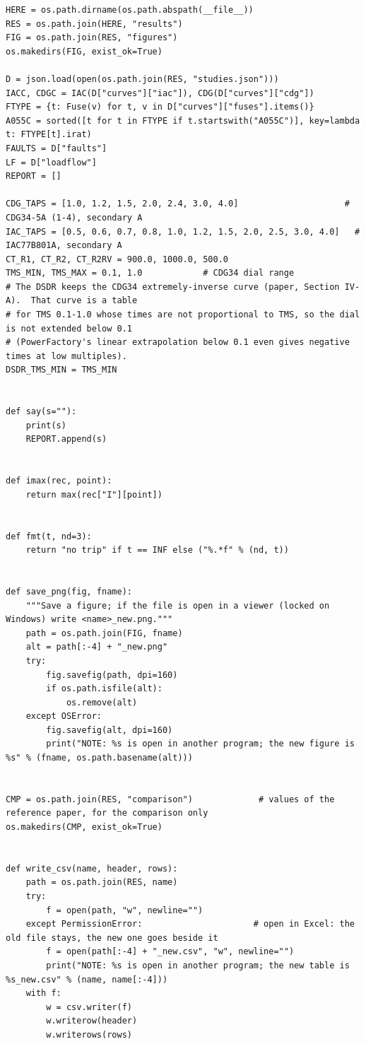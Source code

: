 \documentclass[12pt,a4paper]{article}
\begin{document}
\begin{lstlisting}
HERE = os.path.dirname(os.path.abspath(__file__))
RES = os.path.join(HERE, "results")
FIG = os.path.join(RES, "figures")
os.makedirs(FIG, exist_ok=True)

D = json.load(open(os.path.join(RES, "studies.json")))
IACC, CDGC = IAC(D["curves"]["iac"]), CDG(D["curves"]["cdg"])
FTYPE = {t: Fuse(v) for t, v in D["curves"]["fuses"].items()}
A055C = sorted([t for t in FTYPE if t.startswith("A055C")], key=lambda t: FTYPE[t].irat)
FAULTS = D["faults"]
LF = D["loadflow"]
REPORT = []

CDG_TAPS = [1.0, 1.2, 1.5, 2.0, 2.4, 3.0, 4.0]                     # CDG34-5A (1-4), secondary A
IAC_TAPS = [0.5, 0.6, 0.7, 0.8, 1.0, 1.2, 1.5, 2.0, 2.5, 3.0, 4.0]   # IAC77B801A, secondary A
CT_R1, CT_R2, CT_R2RV = 900.0, 1000.0, 500.0
TMS_MIN, TMS_MAX = 0.1, 1.0            # CDG34 dial range
# The DSDR keeps the CDG34 extremely-inverse curve (paper, Section IV-A).  That curve is a table
# for TMS 0.1-1.0 whose times are not proportional to TMS, so the dial is not extended below 0.1
# (PowerFactory's linear extrapolation below 0.1 even gives negative times at low multiples).
DSDR_TMS_MIN = TMS_MIN


def say(s=""):
    print(s)
    REPORT.append(s)


def imax(rec, point):
    return max(rec["I"][point])


def fmt(t, nd=3):
    return "no trip" if t == INF else ("%.*f" % (nd, t))


def save_png(fig, fname):
    """Save a figure; if the file is open in a viewer (locked on Windows) write <name>_new.png."""
    path = os.path.join(FIG, fname)
    alt = path[:-4] + "_new.png"
    try:
        fig.savefig(path, dpi=160)
        if os.path.isfile(alt):
            os.remove(alt)
    except OSError:
        fig.savefig(alt, dpi=160)
        print("NOTE: %s is open in another program; the new figure is %s" % (fname, os.path.basename(alt)))


CMP = os.path.join(RES, "comparison")             # values of the reference paper, for the comparison only
os.makedirs(CMP, exist_ok=True)


def write_csv(name, header, rows):
    path = os.path.join(RES, name)
    try:
        f = open(path, "w", newline="")
    except PermissionError:                      # open in Excel: the old file stays, the new one goes beside it
        f = open(path[:-4] + "_new.csv", "w", newline="")
        print("NOTE: %s is open in another program; the new table is %s_new.csv" % (name, name[:-4]))
    with f:
        w = csv.writer(f)
        w.writerow(header)
        w.writerows(rows)



\end{lstlisting}
\end{document}
